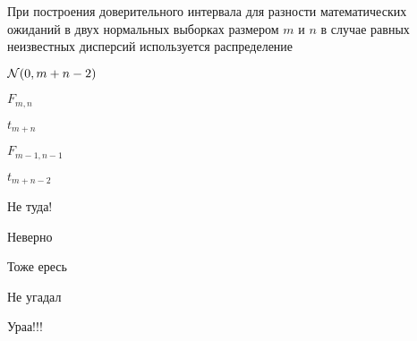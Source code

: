 
\begin{question}
При построения доверительного интервала для разности математических
ожиданий в двух нормальных выборках размером \(m\) и \(n\) в случае
равных неизвестных дисперсий используется распределение
\begin{answerlist}
  \item \(\mathcal{N}(0, m+n-2)\)
  \item \(F_{m,n}\)
  \item \(t_{m+n}\)
  \item \(F_{m-1, n-1}\)
  \item \(t_{m+n-2}\)
\end{answerlist}
\end{question}

\begin{solution}
\begin{answerlist}
  \item Не туда!
  \item Неверно
  \item Тоже ересь
  \item Не угадал
  \item Ураа!!!
\end{answerlist}
\end{solution}

